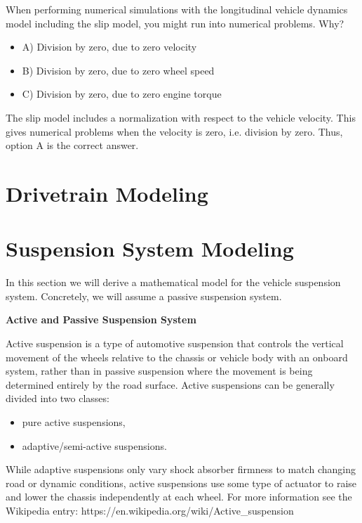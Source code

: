 When performing numerical simulations with the longitudinal vehicle dynamics model including the slip model, you might run into numerical problems. Why?

\begin{itemize}
\item A) Division by zero, due to zero velocity 
\item B) Division by zero, due to zero wheel speed 
\item C) Division by zero, due to zero engine torque 
\end{itemize}

The slip model includes a normalization with respect to the vehicle velocity. This gives numerical problems when the velocity is zero, i.e. division by zero. Thus, option A is the correct answer.


\section{Drivetrain Modeling}

\section{Suspension System Modeling}

In this section we will derive a mathematical model for the vehicle suspension system. Concretely, we will assume a passive suspension system.


\begin{framed}

\textbf{Active and Passive Suspension System}

Active suspension is a type of automotive suspension that controls the vertical movement of the wheels relative to the chassis or vehicle body with an onboard system, rather than in passive suspension where the movement is being determined entirely by the road surface. Active suspensions can be generally divided into two classes: 

\begin{itemize}
\item pure active suspensions, 
\item adaptive/semi-active suspensions. 
\end{itemize}
While adaptive suspensions only vary shock absorber firmness to match changing road or dynamic conditions, active suspensions use some type of actuator to raise and lower the chassis independently at each wheel. For more information see the Wikipedia entry: https://en.wikipedia.org/wiki/Active\_suspension

\end{framed}


